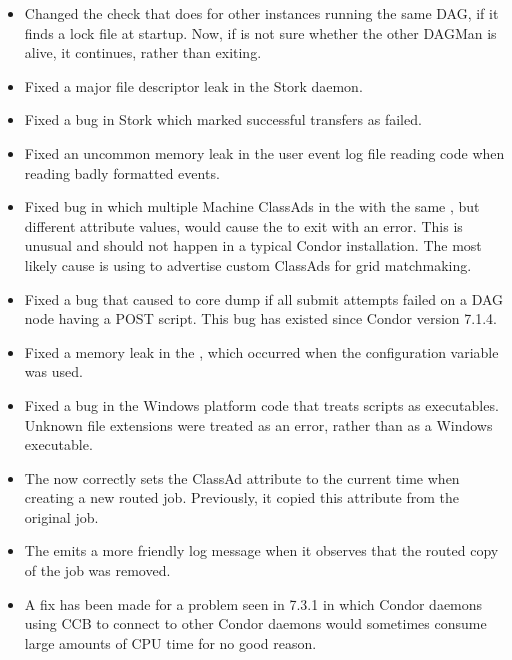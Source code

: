 \begin{itemize}
\item Changed the check that  does for other
 instances
running the same DAG, if it finds a lock file at startup.
Now, if  is not sure whether the other DAGMan is alive,
it continues, rather than exiting.

\item Fixed a major file descriptor leak in the Stork daemon.

\item Fixed a bug in Stork which marked successful transfers as failed.

\item Fixed an uncommon memory leak in the user event log file reading code
when reading badly formatted events.

\item Fixed bug in which multiple Machine ClassAds in the
 with the same ,
but different  attribute values,
would cause the  to exit with an error.
This is unusual and should not happen in a typical Condor installation.
The most likely cause is using 
to advertise custom ClassAds for grid matchmaking.

\item Fixed a bug that caused  to core dump if all
submit attempts failed on a DAG node having a POST script.
This bug has existed since Condor version 7.1.4.

\item Fixed a memory leak in the , which occurred when
the configuration variable  was used.

\item Fixed a bug in the Windows platform code that treats scripts as
  executables.
  Unknown file extensions were treated as an error,
  rather than as a Windows executable.

\item The  now correctly sets the ClassAd attribute
 to the current time when creating a new routed job.
Previously, it copied this attribute from the original job.

\item The  emits a more friendly log message when it
observes that the routed copy of the job was removed.

\item A fix has been made for a problem seen in 7.3.1 in which Condor daemons
using CCB to connect to other Condor daemons would sometimes consume
large amounts of CPU time for no good reason.


\end{itemize}
